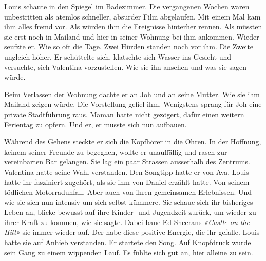 \sectionbreak

Louis schaute in den Spiegel im Badezimmer. Die vergangenen Wochen waren
unbestritten als atemlos schneller, absurder Film abgelaufen. Mit einem
Mal kam ihm alles fremd vor. Als würden ihm die Ereignisse hinterher
rennen. Als müssten sie erst noch in Mailand und hier in seiner Wohnung
bei ihm ankommen. Wieder seufzte er. Wie so oft die Tage. Zwei Hürden standen noch vor ihm. Die Zweite ungleich höher.
Er schüttelte sich, klatschte sich Wasser ins Gesicht und versuchte,
sich Valentina vorzustellen. Wie sie ihn ansehen und was sie sagen
würde.

Beim Verlassen der Wohnung dachte er an Joh und an seine Mutter. Wie sie
ihm Mailand zeigen würde. Die Vorstellung gefiel ihm. Wenigstens sprang
für Joh eine private Stadtführung raus. Maman hatte nicht gezögert,
dafür einen weitern Ferientag zu opfern. 
Und er, er musste sich nun aufbauen. 

Während des Gehens steckte er sich
die Kopfhörer in die Ohren. In der Hoffnung, keinem seiner Freunde zu
begegnen, wollte er unauffällig und rasch zur vereinbarten Bar gelangen.
Sie lag ein paar Strassen ausserhalb des Zentrums. Valentina hatte seine
Wahl verstanden. Den Songtipp hatte er von Ava. Louis hatte ihr fasziniert zugehört, als
sie ihm von Daniel erzählt hatte. Von seinem tödlichen Motorradunfall.
Aber auch von ihren gemeinsamen Erlebnissen. Und wie sie sich nun
intensiv um sich selbst kümmere. Sie schaue sich ihr bisheriges Leben
an, blicke bewusst auf ihre Kinder- und Jugendzeit zurück, um wieder zu
ihrer Kraft zu kommen, wie sie sagte. Dabei baue Ed Sheerans
\emph{«Castle on the Hill»} sie immer wieder auf. Der habe diese
positive Energie, die ihr gefalle. Louis hatte sie auf Anhieb
verstanden. Er startete den Song. Auf Knopfdruck wurde sein Gang zu
einem wippenden Lauf. Es fühlte sich gut an, hier alleine zu sein.

